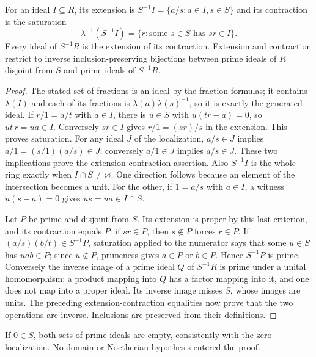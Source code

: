 \begin{theorem}\label{thm:localization-primes}
For an ideal $I\subseteq R$, its extension is
$S^{-1}I=\{a/s:a\in I,s\in S\}$ and its contraction is the saturation
\[
 \lambda^{-1}(S^{-1}I)=\{r:\text{some }s\in S\text{ has }sr\in I\}.
\]
Every ideal of $S^{-1}R$ is the extension of its contraction.
Extension and contraction restrict to inverse inclusion-preserving
bijections between prime ideals of $R$ disjoint from $S$ and prime
ideals of $S^{-1}R$.
\end{theorem}
\begin{proof}
The stated set of fractions is an ideal by the fraction formulas;
it contains $\lambda(I)$ and each of its fractions is
$\lambda(a)\lambda(s)^{-1}$, so it is exactly the generated ideal.
If $r/1=a/t$ with $a\in I$, there is $u\in S$ with $u(tr-a)=0$,
so $ut\,r=ua\in I$. Conversely $sr\in I$ gives
$r/1=(sr)/s$ in the extension. This proves saturation.
For any ideal $J$ of the localization, $a/s\in J$ implies
$a/1=(s/1)(a/s)\in J$; conversely $a/1\in J$ implies $a/s\in J$.
These two implications prove the extension-contraction assertion.
Also $S^{-1}I$ is the whole ring exactly when $I\cap S\ne\varnothing$.
One direction follows because an element of the intersection becomes
a unit. For the other, if $1=a/s$ with $a\in I$, a witness
$u(s-a)=0$ gives $us=ua\in I\cap S$.

Let $P$ be prime and disjoint from $S$. Its extension is proper by this
last criterion, and its contraction equals $P$: if $sr\in P$,
then $s\notin P$ forces $r\in P$.
If $(a/s)(b/t)\in S^{-1}P$, saturation applied to the numerator says
that some $u\in S$ has $uab\in P$; since $u\notin P$, primeness gives
$a\in P$ or $b\in P$. Hence $S^{-1}P$ is prime.
Conversely the inverse image of a prime ideal $Q$ of $S^{-1}R$ is prime
under a unital homomorphism: a product mapping into $Q$ has a factor
mapping into it, and one does not map into a proper ideal.
Its inverse image misses $S$, whose images are units.
The preceding extension-contraction equalities now prove that the two
operations are inverse. Inclusions are preserved from their definitions.
\end{proof}
If $0\in S$, both sets of prime ideals are empty, consistently with the
zero localization. No domain or Noetherian hypothesis entered the proof.

